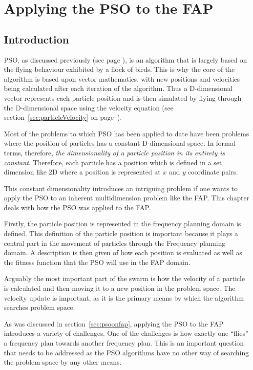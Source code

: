 \chapter{Applying the \gls{PSO} to the \gls{FAP}}
\label{chpt:psoapplicationFAP}
\section{Introduction}
PSO, as discussed previously (see page \pageref{sec:PSO}), is an algorithm that is largely based on the flying behaviour exhibited by a flock of birds. This is why the core of the algorithm is based upon vector mathematics, with new positions and velocities being calculated after each iteration of the algorithm. Thus a D-dimensional vector represents each particle position and is then simulated by flying through the D-dimensional space using the velocity equation (see section~\ref{sec:particleVelocity} on page~\pageref{eq:velocityupdate}).

Most of the problems to which \gls{PSO} has been applied to date have been problems where the position of particles has a constant D-dimensional space. In formal terms, therefore, \emph{the dimensionality of a particle position in its entirety is constant}. Therefore, each particle has a position which is defined in a set dimension like 2D where a position is represented at $x$ and $y$ coordinate pairs.

This constant dimensionality introduces an intriguing problem if one wants to apply the \gls{PSO} to an inherent multidimension problem like the \gls{FAP}. This chapter deals with how the \gls{PSO} was applied to the \gls{FAP}.

Firstly, the particle position is represented in the frequency planning domain is defined. This definition of the particle position is important because it plays a central part in
the movement of particles through the Frequency planning domain. A description is then given of how each position is evaluated as well as the fitness function that the \gls{PSO} will use in the \gls{FAP} domain.

Arguably the most important part of the swarm is how the velocity of a particle is calculated and then moving it to a new position in the problem space. The velocity update is important, as it is the primary means by which the algorithm searches problem space.

As was discussed in section~\ref{sec:psoonfap}, applying the \gls{PSO} to the \gls{FAP} introduces a variety of challenges. One of the challenges is how exactly one ``flies'' a frequency plan towards another frequency plan. This is an important question that needs to be addressed as the \gls{PSO} algorithms have no other way of searching the problem space by any other means.

